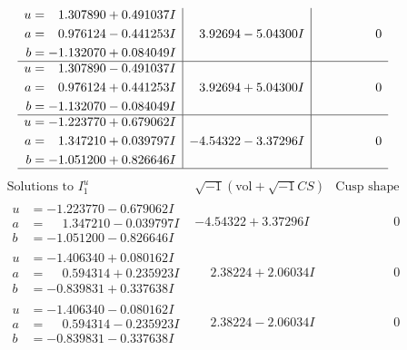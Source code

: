 \documentclass[1p]{elsarticle_modified}
\theoremstyle{definition}
\newcommand{\I}{\sqrt{-1}}
\begin{document}
$$\begin{array}{c|c|c}
\begin{aligned}
u &= \phantom{-}1.307890 + 0.491037 I \\
a &= \phantom{-}0.976124 - 0.441253 I \\
b &= -1.132070 + 0.084049 I\end{aligned}
 & \phantom{-}3.92694 - 5.04300 I & \phantom{-0.000000 } 0 \\ \hline\begin{aligned}
u &= \phantom{-}1.307890 - 0.491037 I \\
a &= \phantom{-}0.976124 + 0.441253 I \\
b &= -1.132070 - 0.084049 I\end{aligned}
 & \phantom{-}3.92694 + 5.04300 I & \phantom{-0.000000 } 0 \\ \hline\begin{aligned}
u &= -1.223770 + 0.679062 I \\
a &= \phantom{-}1.347210 + 0.039797 I \\
b &= -1.051200 + 0.826646 I\end{aligned}
 & -4.54322 - 3.37296 I & \phantom{-0.000000 } 0\\
 \hline 
 \end{array}$$\newpage$$\begin{array}{c|c|c}  
\text{Solutions to }I^u_{1}& \I (\text{vol} + \sqrt{-1}CS) & \text{Cusp shape}\\
 \hline 
\begin{aligned}
u &= -1.223770 - 0.679062 I \\
a &= \phantom{-}1.347210 - 0.039797 I \\
b &= -1.051200 - 0.826646 I\end{aligned}
 & -4.54322 + 3.37296 I & \phantom{-0.000000 } 0 \\ \hline\begin{aligned}
u &= -1.406340 + 0.080162 I \\
a &= \phantom{-}0.594314 + 0.235923 I \\
b &= -0.839831 + 0.337638 I\end{aligned}
 & \phantom{-}2.38224 + 2.06034 I & \phantom{-0.000000 } 0 \\ \hline\begin{aligned}
u &= -1.406340 - 0.080162 I \\
a &= \phantom{-}0.594314 - 0.235923 I \\
b &= -0.839831 - 0.337638 I\end{aligned}
 & \phantom{-}2.38224 - 2.06034 I & \phantom{-0.000000 } 0 \\ \hline\begin{aligned}

\end{aligned}
\end{array}$$
\end{document}

